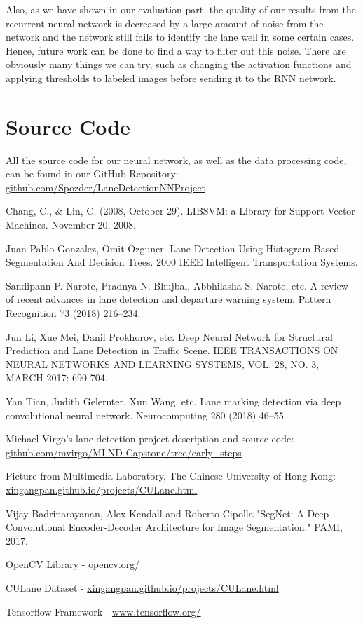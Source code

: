 \documentclass[runningheads]{llncs}
\begin{document}
Also, as we have shown in our evaluation part, the quality of our results from the recurrent neural network is decreased by a large amount of noise from the network and the network still fails to identify the lane well in some certain cases. Hence, future work can be done to find a way to filter out this noise. There are obviously many things we can try, such as changing the activation functions and applying thresholds to labeled images before sending it to the RNN network. \\

\section{Source Code}
All the source code for our neural network, as well as the data processing code, can be found in our GitHub Repository: \url{github.com/Spozder/LaneDetectionNNProject}
%
%
%
% 
% 
%
\pagebreak
\begin{thebibliography}{8}
Chang, C., \& Lin, C. (2008, October 29). LIBSVM: a Library for Support Vector Machines. November 20, 2008.

Juan Pablo Gonzalez, Omit Ozguner. Lane Detection Using Histogram-Based Segmentation And Decision Trees. 2000 IEEE Intelligent Transportation Systems.

Sandipann P. Narote, Pradnya N. Bhujbal, Abbhilasha S. Narote, etc. A review of recent advances in lane detection and departure warning system. Pattern Recognition 73 (2018) 216–234.

Jun Li, Xue Mei, Danil Prokhorov, etc. Deep Neural Network for Structural Prediction and Lane Detection in Traffic Scene. IEEE TRANSACTIONS ON NEURAL NETWORKS AND LEARNING SYSTEMS, VOL. 28, NO. 3, MARCH 2017: 690-704.

Yan Tian, Judith Gelernter, Xun Wang, etc. Lane marking detection via deep convolutional neural network. Neurocomputing 280 (2018) 46–55.

Michael Virgo’s lane detection project description and source code: \\ \url{github.com/mvirgo/MLND-Capstone/tree/early\_steps}

Picture from Multimedia Laboratory, The Chinese University of Hong Kong: \\ \url{xingangpan.github.io/projects/CULane.html}

Vijay Badrinarayanan, Alex Kendall and Roberto Cipolla "SegNet: A Deep Convolutional Encoder-Decoder Architecture for Image Segmentation." PAMI, 2017.

OpenCV Library - \url{opencv.org/}

CULane Dataset - \url{xingangpan.github.io/projects/CULane.html}

Tensorflow Framework - \url{www.tensorflow.org/}


\end{thebibliography}
\end{document}
